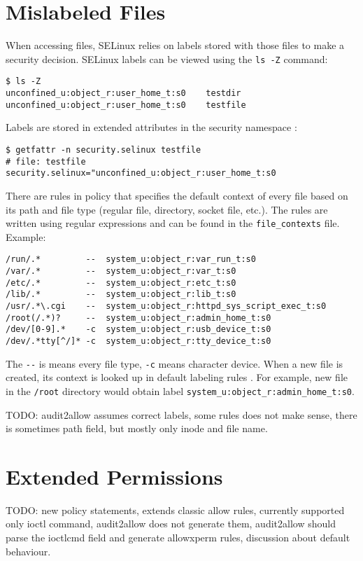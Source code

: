 \section{Mislabeled Files}
When accessing files, SELinux relies on labels stored with those files to make a
security decision. SELinux labels can be viewed using the \texttt{ls -Z}
command:
\begin{lstlisting}
$ ls -Z
unconfined_u:object_r:user_home_t:s0    testdir
unconfined_u:object_r:user_home_t:s0    testfile
\end{lstlisting}
Labels are stored in extended attributes in the security namespace
\cite{xattrman}:
\begin{lstlisting}
$ getfattr -n security.selinux testfile
# file: testfile
security.selinux="unconfined_u:object_r:user_home_t:s0
\end{lstlisting}

There are rules in policy that specifies the default context of every file based
on its path and file type (regular file, directory, socket file, etc.). The
rules are written using regular expressions and can be found in the
\texttt{file\_contexts} file. Example:
\begin{lstlisting}
/run/.*         --  system_u:object_r:var_run_t:s0
/var/.*	        --  system_u:object_r:var_t:s0
/etc/.*	        --  system_u:object_r:etc_t:s0
/lib/.*	        --  system_u:object_r:lib_t:s0
/usr/.*\.cgi    --  system_u:object_r:httpd_sys_script_exec_t:s0
/root(/.*)?     --  system_u:object_r:admin_home_t:s0
/dev/[0-9].*    -c  system_u:object_r:usb_device_t:s0
/dev/.*tty[^/]* -c  system_u:object_r:tty_device_t:s0
\end{lstlisting}
The \texttt{-{}-} is means every file type, \texttt{-c} means character device.
When a new file is created, its context is looked up in default labeling rules
\cite[pp.~31-33]{tsn}.
For example, new file in the \texttt{/root} directory would obtain label
\texttt{system\_u:object\_r:admin\_home\_t:s0}.

TODO: audit2allow assumes correct labels, some rules does not make sense, there
is sometimes path field, but mostly only inode and file name.

\section{Extended Permissions}
TODO: new policy statements, extends classic allow rules, currently supported
only ioctl command, audit2allow does not generate them, audit2allow should parse
the ioctlcmd field and generate allowxperm rules, discussion about default
behaviour.

